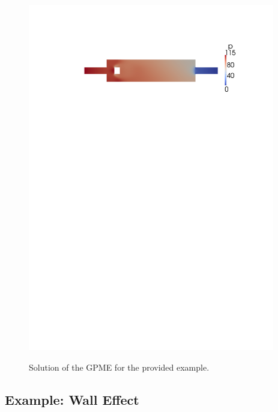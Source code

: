\documentclass{article}
\begin{document}
\begin{figure}[ht]
{   \includegraphics[width=0.96\textwidth,trim=3cm 22.2cm 3cm 3.3cm, clip=true]{fig/example_p2.pdf}
}
        \caption{Solution of the GPME for the provided example.}\label{fig:example_components}
\end{figure}

\subsection{Example: Wall Effect}
\end{document}
